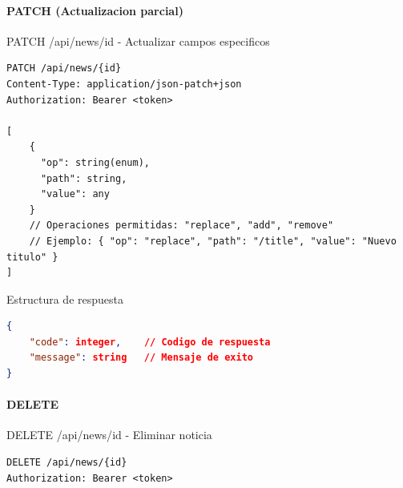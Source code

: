 \documentclass[11pt,a4paper]{article}
\begin{document}
\paragraph{PATCH (Actualizacion parcial)}
\begin{center}
	\begin{minipage}{\textwidth}
		\begin{codebox}{PATCH /api/news/{id} - Actualizar campos especificos}
			\begin{lstlisting}[language=HTTP]
PATCH /api/news/{id}
Content-Type: application/json-patch+json
Authorization: Bearer <token>

[
    { 
      "op": string(enum), 
      "path": string, 
      "value": any 
    }
    // Operaciones permitidas: "replace", "add", "remove"
    // Ejemplo: { "op": "replace", "path": "/title", "value": "Nuevo titulo" }
]
\end{lstlisting}
		\end{codebox}
	\end{minipage}
\end{center}

\begin{center}
    \begin{minipage}{\textwidth}
        \begin{codebox}{Estructura de respuesta}
            \begin{lstlisting}[language=json]
{
    "code": integer,    // Codigo de respuesta
    "message": string   // Mensaje de exito
}
\end{lstlisting}
        \end{codebox}
    \end{minipage}
\end{center}

\paragraph{DELETE}
\begin{center}
	\begin{minipage}{\textwidth}
		\begin{codebox}{DELETE /api/news/{id} - Eliminar noticia}
			\begin{lstlisting}[language=HTTP]
DELETE /api/news/{id}
Authorization: Bearer <token>
\end{lstlisting}
		\end{codebox}
	\end{minipage}
\end{center}
\end{document}
